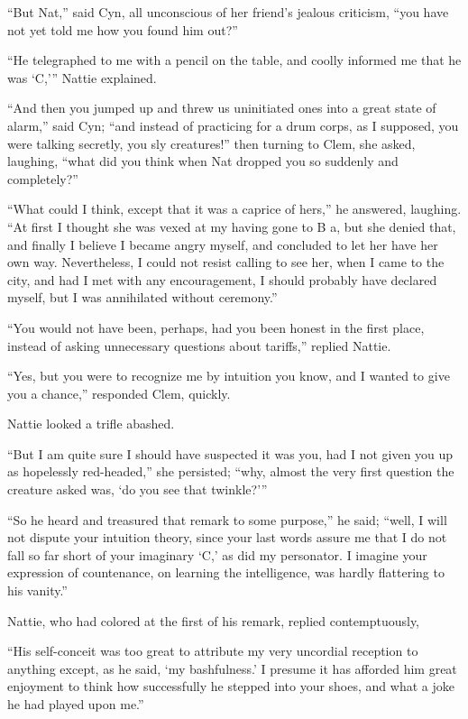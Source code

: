 ``But Nat,'' said Cyn, all unconscious of her friend's jealous criticism,
``you have not yet told me how you found him out?''

``He telegraphed to me with a pencil on the table, and coolly informed me
that he was `C,'{}'' Nattie explained.

``And then you jumped up and threw us uninitiated ones into a great state
of alarm,'' said Cyn; ``and instead of practicing for a drum corps, as I
supposed, you were talking secretly, you sly creatures!'' then turning to
Clem, she asked, laughing, ``what did you think when Nat dropped you so
suddenly and completely?''

``What could I think, except that it was a caprice of hers,'' he answered,
laughing. ``At first I thought she was vexed at my having gone to B a,
but she denied that, and finally I believe I became angry myself, and
concluded to let her have her own way. Nevertheless, I could not resist
calling to see her, when I came to the city, and had I met with any
encouragement, I should probably have declared myself, but I was
annihilated without ceremony.''

``You would not have been, perhaps, had you been honest in the first
place, instead of asking unnecessary questions about tariffs,'' replied
Nattie.

``Yes, but you were to recognize me by intuition you know, and I wanted
to give you a chance,'' responded Clem, quickly.

Nattie looked a trifle abashed.

``But I am quite sure I should have suspected it was you, had I not given
you up as hopelessly red-headed,'' she persisted; ``why, almost the very
first question the creature asked was, `do you see that twinkle?'{}''

``So he heard and treasured that remark to some purpose,'' he said; ``well,
I will not dispute your intuition theory, since your last words assure
me that I do not fall so far short of your imaginary `C,' as did my
personator. I imagine your expression of countenance, on learning the
intelligence, was hardly flattering to his vanity.''

Nattie, who had colored at the first of his remark, replied
contemptuously,

``His self-conceit was too great to attribute my very uncordial reception
to anything except, as he said, `my bashfulness.' I presume it has
afforded him great enjoyment to think how successfully he stepped into
your shoes, and what a joke he had played upon me.''

